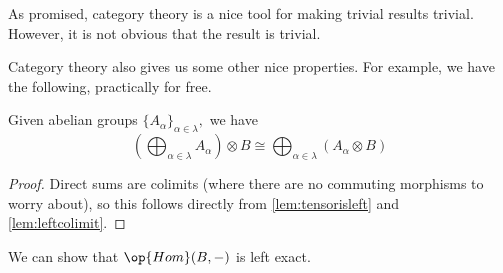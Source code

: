 \documentclass[../notes.tex]{subfiles}
\begin{document}
\begin{remark}
	As promised, category theory is a nice tool for making trivial results trivial. However, it is not obvious that the result is trivial.
\end{remark}
Category theory also gives us some other nice properties. For example, we have the following, practically for free.
\begin{proposition} \label{prop:tensorsums}
	Given abelian groups $\{A_\alpha\}_{\alpha\in\lambda},$ we have
	\[\left(\bigoplus_{\alpha\in\lambda}A_\alpha\right)\otimes B\cong\bigoplus_{\alpha\in\lambda}(A_\alpha\otimes B)\]
\end{proposition}
\begin{proof}
	Direct sums are colimits (where there are no commuting morphisms to worry about), so this follows directly from \autoref{lem:tensorisleft} and \autoref{lem:leftcolimit}.
\end{proof}
\begin{proposition}
	We can show that $\op{Hom}(B,-)$ is left exact.
\end{proposition}
\end{document}
